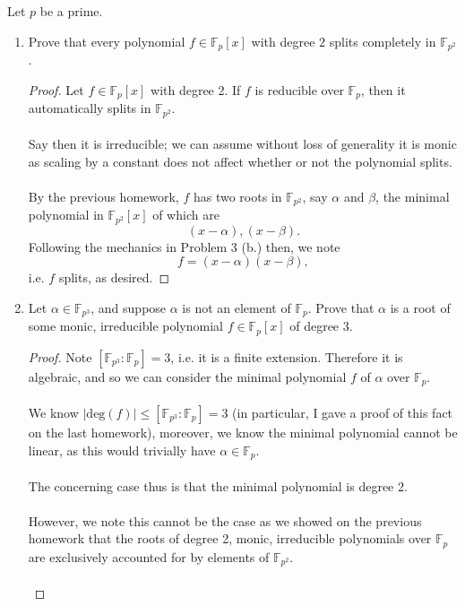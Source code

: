 \documentclass[12pt]{article}
\newenvironment{ex}[2][Exercise]{\begin{trivlist}
\item[\hskip \labelsep {\bfseries #1}\hskip \labelsep {\bfseries #2.}]}{\end{trivlist}}
\begin{document}
\begin{ex}{2}
    Let $p$ be a prime. 
    \begin{enumerate}[label=(\alph*)]
        \item Prove that every polynomial $f \in \mathbb{F}_p[x]$ with degree $2$ splits completely in $\mathbb{F}_{p^2}$. 
        \begin{proof}
            Let $f \in \mathbb{F}_p[x]$ with degree 2. If $f$ is reducible over $\mathbb{F}_p$, then it automatically splits in $\mathbb{F}_{p^2}$. \\ \\
            Say then it is irreducible; we can assume without loss of generality it is monic as scaling by a constant does not affect whether or not the polynomial splits.  \\ \\
            By the previous homework, $f$ has two roots in $\mathbb{F}_{p^2}$, say $\alpha$ and $\beta$, the minimal polynomial in $\mathbb{F}_{p^2}[x]$ of which are 
            $$(x - \alpha), (x - \beta).$$
            Following the mechanics in Problem 3 (b.) then, we note 
            $$f = (x - \alpha)(x - \beta),$$
            i.e. $f$ splits, as desired.
        \end{proof}
        \item Let $\alpha \in \mathbb{F}_{p^3}$, and suppose $\alpha$ is not an element of $\mathbb{F}_p$. Prove that $\alpha$ is a root of some monic, irreducible polynomial $f \in \mathbb{F}_p[x]$ of degree 3. 
        \begin{proof}
            Note $[\mathbb{F}_{p^3} : \mathbb{F}_p] = 3$, i.e. it is a finite extension. Therefore it is algebraic, and so we can consider the minimal polynomial $f$ of $\alpha$ over $\mathbb{F}_p$. \\ \\
            We know $|\text{deg}(f)| \leq [\mathbb{F}_{p^3} : \mathbb{F}_p] = 3$ (in particular, I gave a proof of this fact on the last homework), moreover, we know the minimal polynomial cannot be linear, as this would trivially have $\alpha \in \mathbb{F}_p$. \\ \\
            The concerning case thus is that the minimal polynomial is degree 2. \\ \\ However, we note this cannot be the case as we showed on the previous homework that the roots of degree 2, monic, irreducible polynomials over $\mathbb{F}_p$ are exclusively accounted for by elements of $\mathbb{F}_{p^2}$. \\ \\

\end{proof}
\end{enumerate}
\end{ex}
\end{document}
